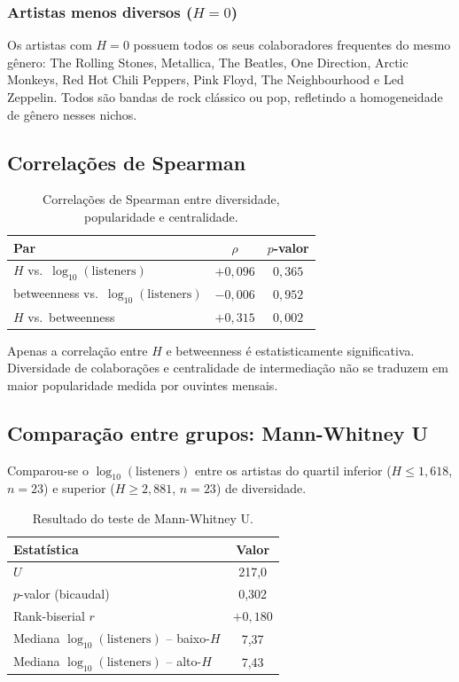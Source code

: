 \documentclass[12pt,a4paper]{article}
\begin{document}
\subsubsection*{Artistas menos diversos ($H = 0$)}

Os artistas com $H = 0$ possuem todos os seus colaboradores frequentes do mesmo gênero: The Rolling Stones, Metallica, The Beatles, One Direction, Arctic Monkeys, Red Hot Chili Peppers, Pink Floyd, The Neighbourhood e Led Zeppelin. Todos são bandas de rock clássico ou pop, refletindo a homogeneidade de gênero nesses nichos.

\subsection{Correlações de Spearman}

\begin{table}[H]
\centering
\caption{Correlações de Spearman entre diversidade, popularidade e centralidade.}
\label{tab:spearman}
\begin{tabular}{lcc}
\toprule
\textbf{Par} & $\rho$ & $p$\textbf{-valor} \\
\midrule
$H$ vs.\ $\log_{10}(\text{listeners})$ & $+0{,}096$ & $0{,}365$ \\
betweenness vs.\ $\log_{10}(\text{listeners})$ & $-0{,}006$ & $0{,}952$ \\
$H$ vs.\ betweenness & $+0{,}315$ & $0{,}002$ \\
\bottomrule
\end{tabular}
\end{table}

Apenas a correlação entre $H$ e betweenness é estatisticamente significativa. Diversidade de colaborações e centralidade de intermediação não se traduzem em maior popularidade medida por ouvintes mensais.

\subsection{Comparação entre grupos: Mann-Whitney U}

Comparou-se o $\log_{10}(\text{listeners})$ entre os artistas do quartil inferior ($H \leq 1{,}618$, $n=23$) e superior ($H \geq 2{,}881$, $n=23$) de diversidade.

\begin{table}[H]
\centering
\caption{Resultado do teste de Mann-Whitney U.}
\label{tab:mwu}
\begin{tabular}{lc}
\toprule
\textbf{Estatística} & \textbf{Valor} \\
\midrule
$U$ & 217,0 \\
$p$-valor (bicaudal) & 0,302 \\
Rank-biserial $r$ & $+0{,}180$ \\
\midrule
Mediana $\log_{10}(\text{listeners})$ -- baixo-$H$ & 7,37 \\
Mediana $\log_{10}(\text{listeners})$ -- alto-$H$  & 7,43 \\
\bottomrule
\end{tabular}
\end{table}
\end{document}
